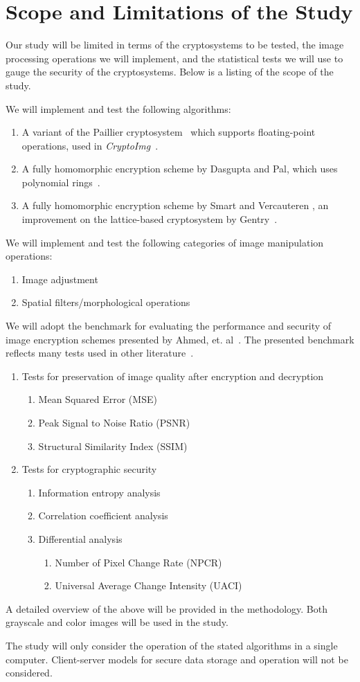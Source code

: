 \section{Scope and Limitations of the Study}
Our study will be limited in terms of the cryptosystems to be tested, the image processing operations we will implement, and the statistical tests we will use to gauge the security of the cryptosystems. Below is a listing of the scope of the study.

We will implement and test the following algorithms:
\begin{enumerate}
	\item A variant of the Paillier cryptosystem~\cite{stern_public-key_1999} which supports floating-point operations, used in \textit{CryptoImg}~\cite{ziad_cryptoimg:_2016}.
	\item A fully homomorphic encryption scheme by Dasgupta and Pal, which uses polynomial rings~\cite{dasgupta_design_2016}.
	\item A fully homomorphic encryption scheme by Smart and Vercauteren \cite{hutchison_fully_2010}, an improvement on the lattice-based cryptosystem by Gentry~\cite{gentry_fully_2009}.
\end{enumerate}
We will implement and test the following categories of image manipulation operations:
\begin{enumerate}
	\item Image adjustment
	\item Spatial filters/morphological operations
\end{enumerate}
We will adopt the benchmark for evaluating the performance and security of image encryption schemes presented by Ahmed, et. al~\cite{ahmed_benchmark_2016}. The presented benchmark reflects many tests used in other literature~\cite{ahmad_efficiency_2012, wu_npcr_2011}.
\begin{enumerate}
	\item Tests for preservation of image quality after encryption and decryption
	\begin{enumerate}
		\item Mean Squared Error (MSE)
		\item Peak Signal to Noise Ratio (PSNR)
		\item Structural Similarity Index (SSIM)
	\end{enumerate}
	\item Tests for cryptographic security
	\begin{enumerate}
		\item Information entropy analysis
		\item Correlation coefficient analysis
		\item Differential analysis
        \begin{enumerate}
            \item Number of Pixel Change Rate (NPCR)
            \item Universal Average Change Intensity (UACI)
        \end{enumerate}
	\end{enumerate}
\end{enumerate}
A detailed overview of the above will be provided in the methodology.
Both grayscale and color images will be used in the study.

The study will only consider the operation of the stated algorithms in a single computer. Client-server models for secure data storage and operation will not be considered.

